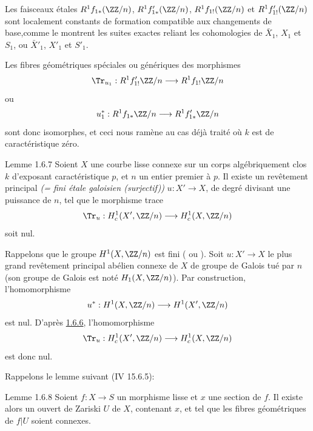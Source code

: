 Les faisceaux étales $R^{1}f_{1\ast}(\ZZ/n)$,
$R^{1}f'_{1\ast}(\ZZ/n)$, $R^{1}f_{1!}(\ZZ/n)$ et
$R^{1}f'_{1!}(\ZZ/n)$ sont localement constants de formation
compatible aux changements de base,\pageoriginale comme le montrent
les suites exactes reliant les cohomologies de $\bar{X}_{1}$, $X_{1}$
et $S_{1}$, ou $\bar{X}'_{1}$, $X'_{1}$ et $S'_{1}$.

Les fibres géométriques spéciales ou génériques des morphismes 
$$
\Tr_{u_{1}}:R^{1}f'_{1!}\ZZ/n\longrightarrow
R^{1}f_{1!}\ZZ/n
$$
ou
$$
u^{\ast}_{1}:R^{1}f_{1\ast}\ZZ/n\longrightarrow
R^{1}f'_{1\ast}\ZZ/n
$$
sont donc isomorphes, et ceci nous ramène au cas déjà traité où $k$
est de caractéristique zéro.

\begin{enonce*}{Lemme 1.6.7}
Soient $X$ une courbe lisse connexe sur un corps algébriquement clos
$k$ d'exposant caractéristique $p$, et $n$ un entier premier à $p$. Il
existe un revêtement principal \emph{(= fini étale galoisien
(surjectif))} $u:X'\rightarrow X$, de degré divisant une puissance de
$n$, tel que le morphisme trace
$$
\Tr_{u}:H^{1}_{c}(X', \ZZ/n)\longrightarrow
H^{1}_{c}(X,\ZZ/n)
$$
soit nul.
\end{enonce*}

Rappelons que le groupe $H^{1}(X,\ZZ/n)$ est fini ( ou
). Soit $u:X'\rightarrow X$ le plus grand revêtement principal
abélien connexe de $X$ de groupe de Galois tué par $n$ (son groupe de
Galois est noté $H_{1}(X,\ZZ/n)$). Par construction,
l'homomorphisme
$$
u^{\ast}:H^{1}(X,\ZZ/n)\longrightarrow H^{1}(X', \ZZ/n)
$$
est nul. D'après \hyperref[XVIII.lem1.6.6]{1.6.6}, l'homomorphisme
$$
\Tr_{u}:H^{1}_{c}(X',\ZZ/n)\longrightarrow
H^{1}_{c}(X,\ZZ/n)
$$
est donc nul.

Rappelons le lemme suivant (\EGA IV 15.6.5):

\begin{enonce*}{Lemme 1.6.8}
Soient $f:X\rightarrow S$ un morphisme lisse et $x$ une section de
$f$. Il existe alors un ouvert de Zariski $U$ de $X$, contenant $x$,
et tel que les fibres géométriques de $f|U$ soient connexes.
\end{enonce*}

